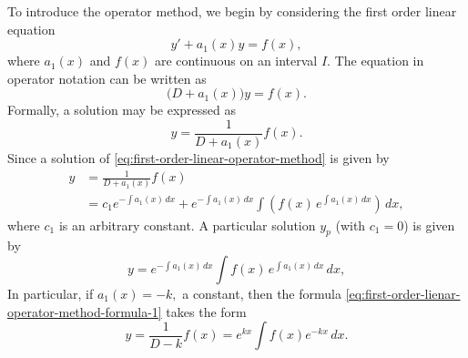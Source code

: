 To introduce the operator method, we begin by considering the first order linear equation
\begin{equation}\label{eq:first-order-linear-operator-method}
	y'+a_1(x) y = f(x),
\end{equation} 
where  
$a_1(x)$ and $f(x)$ are continuous  on an interval $I.$ The equation in operator notation can be written as
\[\big(D+a_1(x)\big)y = f(x).\] Formally,  a  solution may be expressed as 
\[y = \frac{1}{D+a_1(x)}f(x).\]  Since a  solution of \eqref{eq:first-order-linear-operator-method} is given by 
\begin{equation}\label{eq:first-order-lienar-operator-method-formula-general-solution}
	\begin{split}
		y&=\frac{1}{D+a_1(x)}f(x)\\
		& = c_1e^{-\int a_1(x)\,dx} +e^{-\int a_1(x)\,dx} \int\left( f(x) \,e^{\int a_1(x)\,dx}\right)\, dx,
	\end{split}
\end{equation} where $c_1$ is an arbitrary constant.
A particular solution $y_p$ (with $c_1=0$) is given by
 \begin{equation}\label{eq:first-order-lienar-operator-method-formula-1}
 	\boxed{y= e^{-\int a_1(x)\,dx} \int f(x) \,e^{\int a_1(x)\,dx}\, dx,}
 \end{equation}
In particular, if $a_1(x) =-k,$ a constant,  then the formula \eqref{eq:first-order-lienar-operator-method-formula-1} takes the form
\begin{equation}\label{eq:first-order-lienar-operator-method-formula-2}
	\boxed{y =\frac{1}{D-k}f(x)= e^{kx} \int f(x) e^{-kx}\, dx.}
\end{equation}

